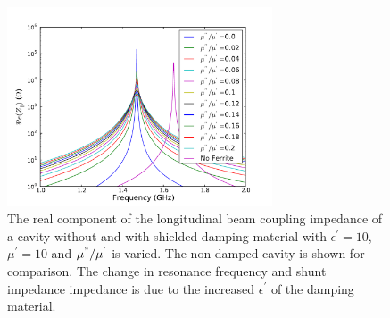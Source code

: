 \begin{figure}
\begin{center}
\includegraphics[width=0.7\textwidth]{Beam_Coupling_Impedance_Reduction_Techniques/figures/screen_long_imp_all.pdf}
\end{center}
\caption{The real component of the longitudinal beam coupling impedance of a cavity without and with shielded damping material with $\epsilon^{'}=10$, $\mu^{'}=10$ and $\mu^{"}/\mu^{'}$ is varied. The non-damped cavity is shown for comparison. The change in resonance frequency and shunt impedance impedance is due to the increased $\epsilon^{'}$ of the damping material.}
\label{fig:screen_long_imp}
\end{figure}


